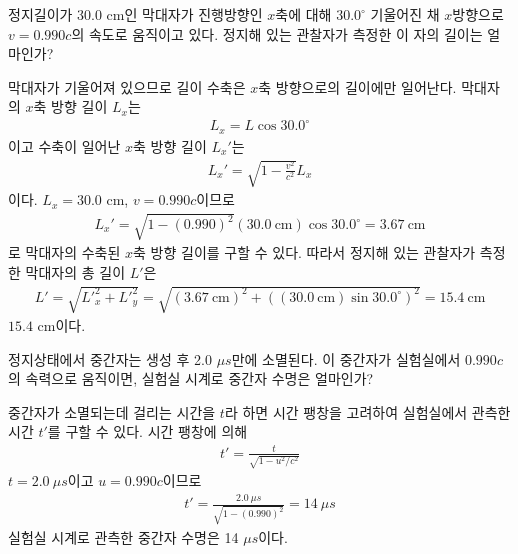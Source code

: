 \documentclass[tightenlines,floatfix,nofootinbib,superscriptaddress,fleqn]{revtex4}
\begin{document}
\vspace{1cm}
정지길이가 30.0 cm인 막대자가 진행방향인 $x$축에 대해 $30.0^\circ$
기울어진 채 $x$방향으로 $v=0.990c$의 속도로 움직이고 있다. 정지해 있는
관찰자가 측정한 이 자의 길이는 얼마인가? 

막대자가 기울어져 있으므로 길이 수축은 $x$축 방향으로의 길이에만 일어난다.
막대자의 $x$축 방향 길이 $L_x$는
\begin{align}
  L_x = L\cos30.0^\circ
\end{align}
이고 수축이 일어난 $x$축 방향 길이 $L_x'$는
\begin{align}
  L_x' = \sqrt{1-\frac{v^2}{c^2}}L_x
\end{align}
이다. $L_x=$30.0 cm, $v=0.990c$이므로
\begin{align}
  L_x' = \sqrt{1-(0.990)^2}(30.0~\mathrm{cm})\cos30.0^\circ
  =3.67~\mathrm{cm}
\end{align}
로 막대자의 수축된 $x$축 방향 길이를 구할 수 있다. 따라서 정지해 있는 관찰자가 측정한 
막대자의 총 길이 $L'$은
\begin{align}
  {L'} = \sqrt{{L'}_x^2+{L'}_y^2} 
  =\sqrt{(3.67~\mathrm{cm})^2+((30.0~\mathrm{cm})\sin30.0^\circ)^2} 
  =15.4~\mathrm{cm}
\end{align}
$15.4$ cm이다.

\vspace{1cm}
정지상태에서 중간자는 생성 후 2.0 $\mu s$만에 소멸된다. 이 중간자가
실험실에서 $0.990c$의 속력으로 움직이면, 실험실 시계로 중간자 수명은
얼마인가? 

중간자가 소멸되는데 걸리는 시간을 $t$라 하면 시간 팽창을 고려하여 실험실에서 관측한
시간 $t'$를 구할 수 있다. 시간 팽창에 의해
\begin{align}
  t' = \frac{t}{\sqrt{1-u^2/c^2}}
\end{align}
$t=2.0~\mu s$이고 $u=0.990c$이므로
\begin{align}
  t' = \frac{2.0~\mu s}{\sqrt{1-(0.990)^2}}
  =14~\mu s
\end{align}
실험실 시계로 관측한 중간자 수명은 14 $\mu s$이다.
\end{document}
